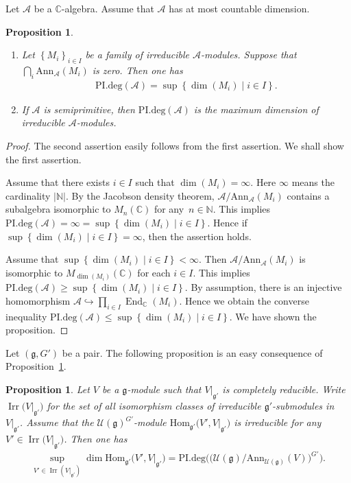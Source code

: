 \documentclass[10pt,a4paper]{amsart}
\numberwithin{equation}{section}
\newtheorem{Proposition}[Theorem]{Proposition}
\theoremstyle{definition}
\newcommand{\set}[1]{\left\{#1 \right\}}
\newcommand{\Hom}{\mathrm{Hom}}
\DeclareMathOperator{\End}{End}
\newcommand{\BasicRing}[1]{\mathbb{#1}}
\newcommand{\NN}{\BasicRing{N}}
\newcommand{\CC}{\BasicRing{C}}
\newcommand{\Ann}{\mathrm{Ann}}
\newcommand{\PIdeg}{\mathrm{PI.deg}}
\newcommand{\alg}[1]{\mathcal{#1}}
\newcommand{\lieC}[1]{\mathfrak{#1}}
\newcommand{\lie}[1]{\mathfrak{#1}}
\newcommand{\univ}[1]{\mathcal{U}(\lieC{#1})}
\DeclareMathOperator{\Irr}{\mathrm{Irr}}
\begin{document}
Let $\alg{A}$ be a $\CC$-algebra.
Assume that $\alg{A}$ has at most countable dimension.

\begin{Proposition}\label{prop:PIdegMaximumDim}\qquad
	\begin{enumerate}\itemsep=0pt
		\item[$1.$] Let $\set{M_i}_{i \in I}$ be a family of irreducible $\alg{A}$-modules.
		Suppose that $\bigcap_i \Ann_{\alg{A}}(M_i)$ is zero.
		Then one has
		\begin{align*}
			\PIdeg(\alg{A}) = \sup\set{\dim(M_i)\mid i \in I}.
		\end{align*}
		\item[$2.$] If $\alg{A}$ is semiprimitive, then $\PIdeg(\alg{A})$ is the maximum dimension of irreducible $\alg{A}$-modules.
	\end{enumerate}
\end{Proposition}

\begin{proof}
	The second assertion easily follows from the first assertion.
	We shall show the first assertion.

	Assume that there exists $i \in I$ such that $\dim(M_i) = \infty$.
	Here $\infty$ means the cardinality $|\NN|$.
	By the Jacobson density theorem, $\alg{A}/\Ann_{\alg{A}}(M_i)$ contains a subalgebra isomorphic to $M_n(\CC)$ for any~${n \in \NN}$.
	This implies $\PIdeg(\alg{A}) = \infty = \sup\set{\dim(M_i)\mid i \in I}$.
	Hence if ${\sup\set{\dim(M_i)\mid i \in I} = \infty}$, then the assertion holds.

	Assume that $\sup\set{\dim(M_i)\mid i \in I} < \infty$.
	Then $\alg{A}/\Ann_{\alg{A}}(M_i)$ is isomorphic to $M_{\dim(M_i)}(\CC)$ for each $i \in I$.
	This implies $\PIdeg(\alg{A}) \geq \sup\set{\dim(M_i)\mid i \in I}$.
	By assumption, there is an injective homomorphism $\alg{A} \hookrightarrow \prod_{i \in I} \End_{\CC}(M_i)$.
	Hence we obtain the converse inequality $\PIdeg(\alg{A}) \leq \sup\set{\dim(M_i)\mid i \in I}$.
	We have shown the proposition.
\end{proof}

Let $(\lie{g}, G')$ be a pair.
The following proposition is an easy consequence of Proposition~\ref{prop:PIdegMaximumDim}.

\begin{Proposition}\label{prop:PIdegMultiplicity}
	Let $V$ be a $\lie{g}$-module such that $V|_{\lie{g'}}$ is completely reducible.
	Write $\Irr\bigl(V|_{\lie{g'}}\bigr)$ for the set of all isomorphism classes of irreducible $\lie{g'}$-submodules in $V|_{\lie{g'}}$.
	Assume that the $\univ{g}^{G'}$-module $\Hom_{\lie{g'}}\bigl(V', V|_{\lie{g'}}\bigr)$ is irreducible for any $V' \in \Irr\bigl(V|_{\lie{g'}}\bigr)$.
	Then one has
	\begin{align*}
		\sup_{V' \in \Irr(V|_{\lie{g'}})} \dim \Hom_{\lie{g'}}\bigl(V', V|_{\lie{g'}}\bigr) = \PIdeg\bigl(\bigl(\univ{g}/\Ann_{\univ{g}}(V)\bigr)^{G'}\bigr).
	\end{align*}
\end{Proposition}
\end{document}
